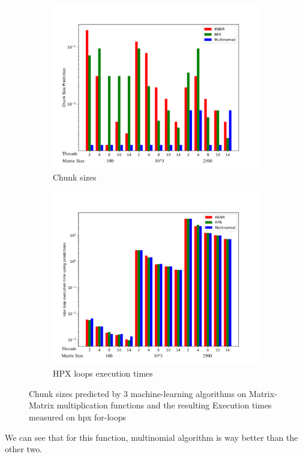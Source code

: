\begin{figure}[h]
	\centering
	\begin{subfigure}[b]{0.5\textwidth}
		\centering
		\includegraphics[width=\textwidth]{images/bars_matrix_cs.pdf}
		\caption[Network2]%
		{{Chunk sizes}}    
	\end{subfigure}
	\hfill
	\begin{subfigure}[b]{0.49\textwidth}  
		\centering 
		\includegraphics[width=\textwidth]{images/bars_matrix_times.pdf}
		\caption[]%
		{{HPX loops execution times}}    
	\end{subfigure}
	\caption{Chunk sizes predicted by 3 machine-learning algorithms on Matrix-Matrix multiplication functions and the resulting Execution times measured on hpx for-loops} 
\end{figure}
We can see that for this function, multinomial algorithm is way better than the other two. 
\newpage

